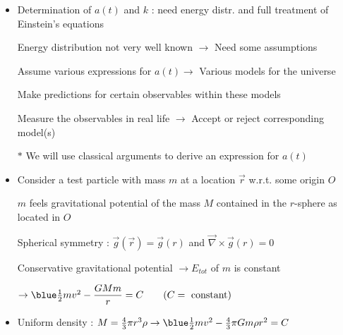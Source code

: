 \onecolumn
\begin{itemize}
\item Determination of $a(t)$ and $k$ : need energy distr. and full treatment of Einstein's equations
\item[] Energy distribution not very well known $\rightarrow$ Need some assumptions
\item[] Assume various expressions for $a(t) \rightarrow$ Various models for the universe
\item[] Make predictions for certain observables within these models
\item[] Measure the observables in real life $\rightarrow$ Accept or reject corresponding model(s)
\item[$\ast$] {\red We will use classical arguments to derive an expression for $a(t)$}
\item Consider a test particle with mass $m$ at a location $\vec{r}$ w.r.t. some origin $O$
\item[] $m$ feels gravitational potential of the mass $M$ contained in the $r$-sphere as located in $O$
\item[] Spherical symmetry : $\vec{g}(\vec{r})=\vec{g}(r)$ and $\vec{\nabla}\times\vec{g}(r)=0$
\item[] {\red Conservative gravitational potential $\rightarrow E_{tot}$ of $m$ is constant}
\item[] $\rightarrow {\blue \frac{1}{2}mv^{2}-{\displaystyle \frac{GMm}{r}}=C} \qquad (C=\text{ constant})$
\item Uniform density : $M=\frac{4}{3}\pi r^{3}\rho
                         \rightarrow {\blue \frac{1}{2}mv^{2}-\frac{4}{3}\pi Gm\rho r^{2}=C}$
\end{itemize}

